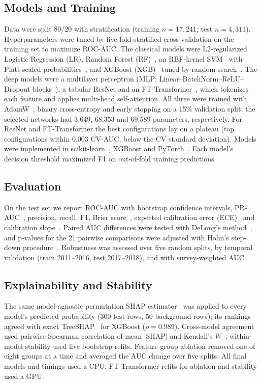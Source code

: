 \documentclass[journal]{IEEEtran}
\begin{document}
\subsection{Models and Training}
Data were split 80/20 with stratification (training $n = 17{,}241$; test $n = 4{,}311$). Hyperparameters were tuned by five-fold stratified cross-validation on the training set to maximize ROC-AUC. The classical models were L2-regularized Logistic Regression (LR), Random Forest (RF)~\cite{breiman2001}, an RBF-kernel SVM~\cite{cortes1995} with Platt-scaled probabilities~\cite{platt1999}, and XGBoost (XGB)~\cite{chen2016} tuned by random search~\cite{bergstra2012}. The deep models were a multilayer perceptron (MLP; Linear--BatchNorm--ReLU--Dropout blocks~\cite{ioffe2015,srivastava2014}), a tabular ResNet and an FT-Transformer~\cite{gorishniy2021}, which tokenizes each feature and applies multi-head self-attention. All three were trained with AdamW~\cite{loshchilov2019}, binary cross-entropy and early stopping on a 15\% validation split; the selected networks had 3{,}649, 68{,}353 and 69{,}589 parameters, respectively. For ResNet and FT-Transformer the best configurations lay on a plateau (top configurations within 0.003 CV-AUC, below the CV standard deviation). Models were implemented in scikit-learn~\cite{pedregosa2011}, XGBoost and PyTorch~\cite{paszke2019}. Each model's decision threshold maximized F1 on out-of-fold training predictions.

\subsection{Evaluation}
On the test set we report ROC-AUC with bootstrap confidence intervals, PR-AUC~\cite{saito2015}, precision, recall, F1, Brier score~\cite{brier1950}, expected calibration error (ECE)~\cite{naeini2015} and calibration slope~\cite{vancalster2019}. Paired AUC differences were tested with DeLong's method~\cite{delong1988,sun2014}, and p-values for the 21 pairwise comparisons were adjusted with Holm's step-down procedure~\cite{holm1979}. Robustness was assessed over five random splits, by temporal validation (train 2011--2016, test 2017--2018), and with survey-weighted AUC.

\subsection{Explainability and Stability}
The same model-agnostic permutation SHAP estimator~\cite{lundberg2017} was applied to every model's predicted probability (300 test rows, 50 background rows); its rankings agreed with exact TreeSHAP~\cite{lundberg2020} for XGBoost ($\rho = 0.989$). Cross-model agreement used pairwise Spearman correlation of mean $|\text{SHAP}|$ and Kendall's $W$~\cite{kendall1939}; within-model stability used five bootstrap refits. Feature-group ablation removed one of eight groups at a time and averaged the AUC change over five splits. All final models and timings used a CPU; FT-Transformer refits for ablation and stability used a GPU.
\end{document}
